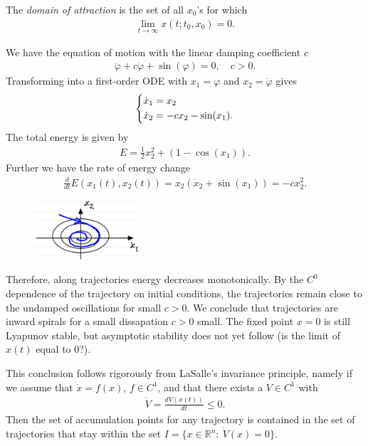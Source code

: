 \begin{definition} 
	The \emph{domain of attraction} is the set of all $ {x}_0$'s for which
	\begin{align}
		\boxed{\lim_{t\to \infty } {x}(t;t_0,  {x}_0)=0. }	
	\end{align}
	
\end{definition}

\begin{ex}
	We have the equation of motion with the linear damping coefficient $c$
	\begin{align}
		\ddot{\varphi} + c \dot{\varphi} + \sin(\varphi) = 0,\quad c>0.
	\end{align}
	Transforming into a first-order ODE with $x_1 = \varphi$ and $x_2 = \dot{\varphi}$ gives
	 \begin{align}
		\begin{dcases}
		\dot{x}_1 = x_2\\ \dot{x}_2 = -cx_2 - \sin(x_1).
		\end{dcases}
	\end{align}
The total energy is given by
\begin{align}
	E = \frac{1}{2}x_2^2 + \left( 1 - \cos(x_1) \right). 
\end{align}
Further we have the rate of energy change
\begin{align}
\frac{d}{dt} E(x_1(t), x_2(t)) = x_2 \left(\dot{x}_2 + \sin(x_1) \right) = -c x_2^{2}.
\end{align}
\begin{figure}[h!]
	\centering
	\includegraphics[width=0.35\textwidth]{figures/ch2/4damped_pendulum.png}
\end{figure}

Therefore, along trajectories energy decreases monotonically. By the $C^0$ dependence of the trajectory on initial conditions, the trajectories remain close to the undamped oscillations for small $c>0$. We conclude that trajectories are inward spirals for a small dissapation $c>0$ small. The fixed point $ {x}=0$ is still Lyapunov stable, but asymptotic stability does not yet follow (is the limit of $ {x}(t)$ equal to 0?).
\begin{remark}
	This conclusion follows rigorously from LaSalle's invariance principle, namely if we assume that $\dot{ {x}}=f( {x})$, $f \in C^1$, and that there exists a $V\in C^1$ with 
	\begin{align}
		\dot{V} = \frac{dV( {x}(t))}{dt} \leq 0.	
	\end{align}
	Then the set of accumulation points for any trajectory is contained in the set of trajectories that stay within the set $I=\{ {x} \in \mathbb{R}^{n}:\ \dot{V}( {x}) = 0\}$.
\end{remark}
\end{ex}

